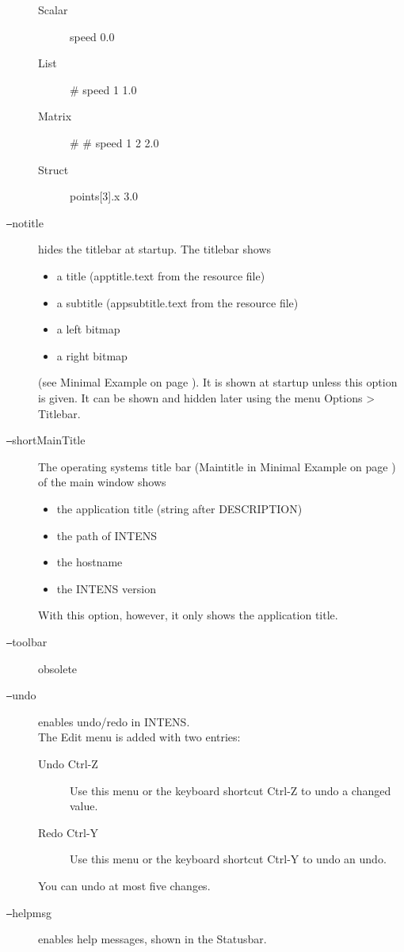 \begin{description}
\begin{description}
  \item[Scalar] speed 0.0
  \item[List] \# speed 1 1.0
  \item[Matrix] \# \# speed 1 2 2.0
  \item[Struct] points[3].x 3.0
  \end{description}
%
\item[\texttt{--}notitle] hides the titlebar at startup.
  The titlebar shows
  \begin{itemize}
  \item a title (apptitle.text from the resource file)
  \item a subtitle (appsubtitle.text from the resource file)
  \item a left bitmap
  \item a right bitmap
  \end{itemize}
  (see Minimal Example on page \pageref{fig:minimalExample}).
  It is shown at startup unless this option is given.
  It can be shown and hidden later using the menu Options > Titlebar.
%
\item[\texttt{--}shortMainTitle]
  The operating systems title bar
  (Maintitle in Minimal Example on page \pageref{fig:minimalExample})
  of the main window shows
  \begin{itemize}
  \item the application title (string after DESCRIPTION)
  \item the path of INTENS
  \item the hostname
  \item the INTENS version
  \end{itemize}
  With this option, however, it only shows the application title.
%
\item[\texttt{--}toolbar]
  obsolete
%
\item[\texttt{--}undo] enables undo/redo in INTENS. \\
  The Edit menu is added with two entries:
  \begin{description}
  \item[Undo Ctrl-Z] Use this menu or the keyboard shortcut Ctrl-Z to undo a changed value.
  \item[Redo Ctrl-Y] Use this menu or the keyboard shortcut Ctrl-Y to undo an undo.
  \end{description}
  You can undo at most five changes.
%
%
\item[\texttt{--}helpmsg] enables help messages, shown in the Statusbar.

\end{description}
